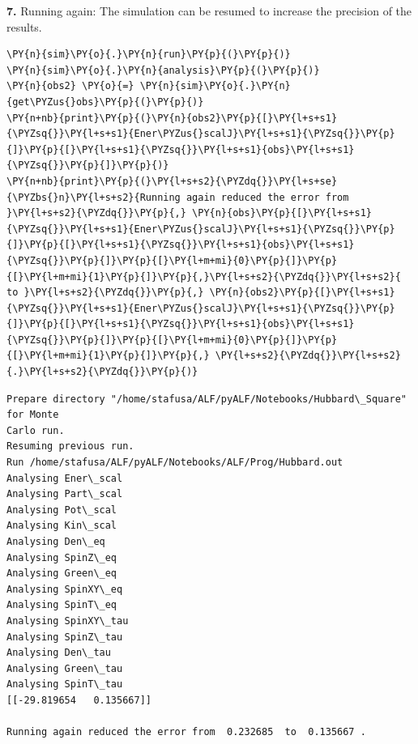 \textbf{7.} Running again: The simulation can be resumed to increase the
precision of the results.

    \begin{tcolorbox}[breakable, size=fbox, boxrule=1pt, pad at break*=1mm,colback=cellbackground, colframe=cellborder]
\begin{Verbatim}[commandchars=\\\{\}]
\PY{n}{sim}\PY{o}{.}\PY{n}{run}\PY{p}{(}\PY{p}{)}
\PY{n}{sim}\PY{o}{.}\PY{n}{analysis}\PY{p}{(}\PY{p}{)}
\PY{n}{obs2} \PY{o}{=} \PY{n}{sim}\PY{o}{.}\PY{n}{get\PYZus{}obs}\PY{p}{(}\PY{p}{)}
\PY{n+nb}{print}\PY{p}{(}\PY{n}{obs2}\PY{p}{[}\PY{l+s+s1}{\PYZsq{}}\PY{l+s+s1}{Ener\PYZus{}scalJ}\PY{l+s+s1}{\PYZsq{}}\PY{p}{]}\PY{p}{[}\PY{l+s+s1}{\PYZsq{}}\PY{l+s+s1}{obs}\PY{l+s+s1}{\PYZsq{}}\PY{p}{]}\PY{p}{)}
\PY{n+nb}{print}\PY{p}{(}\PY{l+s+s2}{\PYZdq{}}\PY{l+s+se}{\PYZbs{}n}\PY{l+s+s2}{Running again reduced the error from }\PY{l+s+s2}{\PYZdq{}}\PY{p}{,} \PY{n}{obs}\PY{p}{[}\PY{l+s+s1}{\PYZsq{}}\PY{l+s+s1}{Ener\PYZus{}scalJ}\PY{l+s+s1}{\PYZsq{}}\PY{p}{]}\PY{p}{[}\PY{l+s+s1}{\PYZsq{}}\PY{l+s+s1}{obs}\PY{l+s+s1}{\PYZsq{}}\PY{p}{]}\PY{p}{[}\PY{l+m+mi}{0}\PY{p}{]}\PY{p}{[}\PY{l+m+mi}{1}\PY{p}{]}\PY{p}{,}\PY{l+s+s2}{\PYZdq{}}\PY{l+s+s2}{ to }\PY{l+s+s2}{\PYZdq{}}\PY{p}{,} \PY{n}{obs2}\PY{p}{[}\PY{l+s+s1}{\PYZsq{}}\PY{l+s+s1}{Ener\PYZus{}scalJ}\PY{l+s+s1}{\PYZsq{}}\PY{p}{]}\PY{p}{[}\PY{l+s+s1}{\PYZsq{}}\PY{l+s+s1}{obs}\PY{l+s+s1}{\PYZsq{}}\PY{p}{]}\PY{p}{[}\PY{l+m+mi}{0}\PY{p}{]}\PY{p}{[}\PY{l+m+mi}{1}\PY{p}{]}\PY{p}{,} \PY{l+s+s2}{\PYZdq{}}\PY{l+s+s2}{.}\PY{l+s+s2}{\PYZdq{}}\PY{p}{)}
\end{Verbatim}
\end{tcolorbox}

    \begin{Verbatim}[commandchars=\\\{\}]
Prepare directory "/home/stafusa/ALF/pyALF/Notebooks/Hubbard\_Square" for Monte
Carlo run.
Resuming previous run.
Run /home/stafusa/ALF/pyALF/Notebooks/ALF/Prog/Hubbard.out
Analysing Ener\_scal
Analysing Part\_scal
Analysing Pot\_scal
Analysing Kin\_scal
Analysing Den\_eq
Analysing SpinZ\_eq
Analysing Green\_eq
Analysing SpinXY\_eq
Analysing SpinT\_eq
Analysing SpinXY\_tau
Analysing SpinZ\_tau
Analysing Den\_tau
Analysing Green\_tau
Analysing SpinT\_tau
[[-29.819654   0.135667]]

Running again reduced the error from  0.232685  to  0.135667 .
    \end{Verbatim}

